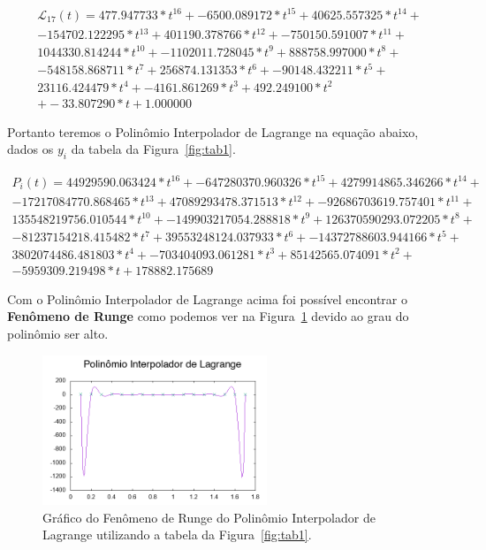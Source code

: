 \documentclass[12pt]{article}
\begin{document}
\begin{gather*}
	\mathcal{L}_{17}(t) = 477.947733*t^{16} + -6500.089172*t^{15} + 40625.557325*t^{14} + \\ -154702.122295*t^{13} + 401190.378766*t^{12} + -750150.591007*t^{11} + \\ 1044330.814244*t^{10} + -1102011.728045*t^{9} + 888758.997000*t^{8} + \\ -548158.868711*t^{7} + 256874.131353*t^{6} + -90148.432211*t^{5} + \\ 23116.424479*t^{4} + -4161.861269*t^{3} + 492.249100*t^{2} \\ + -33.807290*t + 1.000000
\label{eq:degreelagrange}
\end{gather*}

Portanto teremos o Polinômio Interpolador de Lagrange na equação abaixo, dados os $y_{i}$ da tabela da Figura~\ref{fig:tab1}.

\begin{gather*}
P_{i}(t) = 44929590.063424*t^{16} + -647280370.960326*t^{15} + 4279914865.346266*t^{14} + \\ -17217084770.868465*t^{13} + 47089293478.371513*t^{12} + -92686703619.757401*t^{11} + \\ 135548219756.010544*t^{10} + -149903217054.288818*t^{9} + 126370590293.072205*t^{8} + \\ -81237154218.415482*t^{7} + 39553248124.037933*t^{6} + -14372788603.944166*t^{5} + \\ 3802074486.481803*t^{4} + -703404093.061281*t^{3} + 85142565.074091*t^{2} + \\ -5959309.219498*t + 178882.175689
\label{eq:lagrangeq2}
\end{gather*}

Com o Polinômio Interpolador de Lagrange acima foi possível encontrar o \textbf{Fenômeno de Runge} como podemos ver na Figura~\ref{fig:runge} devido ao grau do polinômio ser alto.

\begin{figure}[H]
	\centering
	\includegraphics[width=0.6\textwidth]{p1q2g2.png}
	\caption{Gráfico do Fenômeno de Runge do Polinômio Interpolador de Lagrange utilizando a tabela da Figura~\ref{fig:tab1}.}
	\label{fig:runge}
\end{figure}
\end{document}
